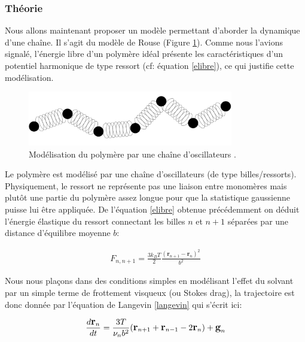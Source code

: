 \documentclass[a4paper,11pt]{article}
\begin{document}
\subsubsection*{Théorie}

Nous allons maintenant proposer un modèle permettant d'aborder la dynamique d'une chaîne. Il s'agit du modèle de Rouse (Figure \ref{rouse}). Comme nous l'avions signalé, l'énergie libre d'un polymère idéal présente les caractéristiques d'un potentiel harmonique de type ressort (cf: équation \ref{elibre}), ce qui justifie cette modélisation.

\begin{figure}[H]
\begin{center}
\includegraphics[width=0.8\textwidth]{rouse.jpg}

\caption{Modélisation du polymère par une chaîne d'oscillateurs \cite{these}.}
\label{rouse}
\end{center}
\end{figure}

Le polymère est modélisé par une chaîne d'oscillateurs (de type billes/ressorts). Physiquement, le ressort ne représente pas une liaison entre monomères mais plutôt une partie du polymère assez longue pour que la statistique gaussienne puisse lui être appliquée. De l'équation \ref{elibre} obtenue précédemment on déduit l'énergie élastique du ressort connectant les billes $n$ et $n+1$ séparées par une distance d'équilibre moyenne $b$:


\begin{eqnarray}
F_{n,n+1} = \frac{3 k_B T}{2} \frac{(\textbf{r}_{n+1}-\textbf{r}_n)^2}{b^2}
\end{eqnarray}

Nous nous plaçons dans des conditions simples en modélisant l'effet du solvant par un simple terme de frottement visqueux (ou Stokes drag), la trajectoire est donc donnée par l'équation de Langevin \ref{langevin} qui s'écrit ici:

\begin{eqnarray}
\large{
\frac{d \textbf{r}_n}{dt} =  \frac{3T}{\nu_n b^2}( \textbf{r}_{n+1} +\textbf{r}_{n-1} -2\textbf{r}_n )  + \textbf{g}_n}
\end{eqnarray}
\end{document}
